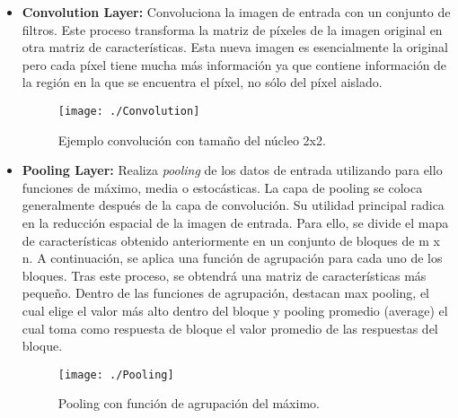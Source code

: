 \documentclass[a4paper, 12pt, oneside]{book}
\begin{document}
\begin{itemize}
\item \textbf{Convolution Layer:} Convoluciona la imagen de entrada con un conjunto de filtros. Este proceso transforma la matriz de píxeles de la imagen original en otra matriz de características. Esta nueva imagen es esencialmente la original pero cada píxel tiene mucha más información ya que contiene información de la región en la que se encuentra el píxel, no sólo del píxel aislado.\\

\begin{figure}[H]
\begin{center}
\texttt{[image: ./Convolution]}
\caption{Ejemplo convolución con tamaño del núcleo 2x2.}
\end{center}
\end{figure}

\item \textbf{Pooling Layer:} Realiza \textit{pooling} de los datos de entrada utilizando para ello funciones de máximo, media o estocásticas. La capa de pooling se coloca generalmente después de la capa de convolución. Su utilidad principal radica en la reducción espacial de la imagen de entrada. Para ello, se divide el mapa de características obtenido anteriormente en un conjunto de bloques de m x n. A continuación, se aplica una función de agrupación para cada uno de los bloques. Tras este proceso, se obtendrá una matriz de características más pequeño. Dentro de las funciones de agrupación, destacan max pooling, el cual elige el valor más alto dentro del bloque y pooling promedio (average) el cual toma como respuesta de bloque el valor promedio de las respuestas del bloque.\\

\begin{figure}[H]
\begin{center}
\texttt{[image: ./Pooling]}
\caption{Pooling con función de agrupación del máximo.}
\end{center}
\end{figure}
\begin{comment}
\item \textbf{Spatial Pyramid Pooling (SPP)} 
\item \textbf{Crop}
\item \textbf{Deconvolution Layer:} Realiza uno convolución transpuesta.
\item \textbf{Im2Col}
\end{comment}
\end{itemize}
\end{document}
